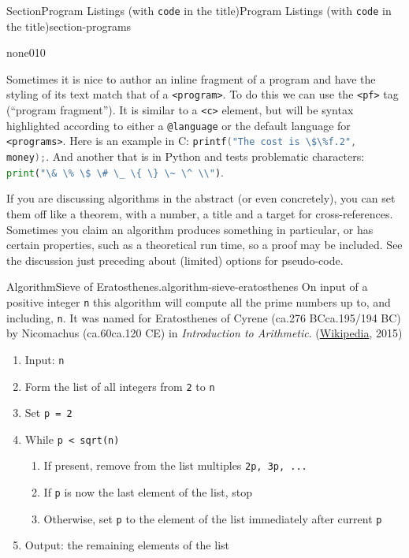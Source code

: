 \documentclass[twoside,10pt,]{article}
\newcommand{\mono}[1]{\texttt{#1}}
\newcommand{\pubtitle}[1]{\textsl{#1}}
\numberwithin{equation}{section}
\newcommand{\programfragment}[2]{\lstinline[language=#1, style=programcodestyle, basicstyle=\ttfamily]#2}
\begin{document}
\begin{sectionptx}{Section}{Program Listings (with \mono{code} in the title)}{}{Program Listings (with \mono{code} in the title)}{}{}{section-programs}
\begin{program}{none}{0}{1}{0}
\end{program}
Sometimes it is nice to author an inline fragment of a program and have the styling of its text match that of a \mono{<program>}. To do this we can use the \mono{<pf>} tag (``program fragment'').  It is similar to a \mono{<c>} element, but will be syntax highlighted according to either a \mono{@language} or the default language for \mono{<programs>}. Here is an example in C: \programfragment{C}{`printf("The cost is \$\%f.2", money);`}. And another that is in Python and tests problematic characters: \programfragment{Python}{`print("\& \% \$ \# \_ \{ \} \~ \^ \\")`}.%
\par
If you are discussing algorithms in the abstract (or even concretely), you can set them off like a theorem, with a number, a title and a target for cross-references.  Sometimes you claim an algorithm produces something in particular, or has certain properties, such as a theoretical run time, so a proof may be included.  See the discussion just preceding about (limited) options for pseudo-code.%
\begin{algorithm}{Algorithm}{Sieve of Eratosthenes.}{}{algorithm-sieve-eratosthenes}%
On input of a positive integer \mono{n} this algorithm will compute all the prime numbers up to, and including, \mono{n}.  It was named for Eratosthenes of Cyrene (ca.\@ 276 BC\textendash{}ca.\@ 195\slash{}194 BC) by Nicomachus (ca.\@ 60\textendash{}ca.\@ 120 CE) in \pubtitle{Introduction to Arithmetic}. (\href{http://en.wikipedia.org/wiki/Sieve_of_Eratosthenes}{Wikipedia}, 2015)%
\begin{enumerate}
\item{}Input: \mono{n}%
\item{}Form the list of all integers from \mono{2} to \mono{n}%
\item{}Set \mono{p = 2}%
\item{}While \mono{p < sqrt(n)}%
\begin{enumerate}[label={\arabic*.}]
\item{}If present, remove from the list multiples \mono{2p, 3p, ...}%
\item{}If \mono{p} is now the last element of the list, stop%
\item{}Otherwise, set \mono{p} to the element of the list immediately after current \mono{p}%
\end{enumerate}
%
\item{}Output: the remaining elements of the list%
\end{enumerate}

\end{algorithm}
\end{sectionptx}
\end{document}
